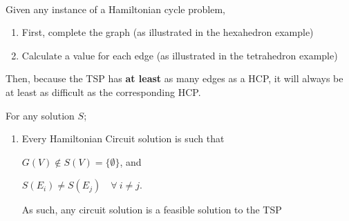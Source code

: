 \documentclass[12pt,letterpaper]{exam}
\begin{document}
\begin{questions}
\begin{parts}
\begin{solution}
\begin{subparts}
\begin{minipage}{0.225\linewidth}
				\end{minipage} \\[1em]
				
				
				\subpart
				
				Given any instance of a Hamiltonian cycle problem,
				\begin{enumerate}
					\item First, complete the graph (as illustrated in the hexahedron example)
					\item Calculate a value for each edge (as illustrated in the tetrahedron example)
				\end{enumerate}
				
				Then, because the TSP has \textbf{at least} as many edges as a HCP, it will always be 
				at least as difficult as the corresponding HCP.
								
				
				\subpart
				For any solution \(S\);
				
				\begin{enumerate}
					\item
					Every Hamiltonian Circuit solution is such that
					
					\(G(V) \notin S(V) = \{\emptyset\} \), and
	
					\(S(E_i) \neq S(E_j) \quad \forall\ i\neq j\).
				
					As such, any circuit solution is a feasible solution to the TSP	
					

\end{enumerate}
\end{subparts}
\end{solution}
\end{parts}
\end{questions}
\end{document}

